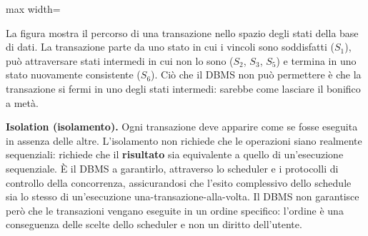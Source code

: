 \documentclass[12pt]{extarticle}
\begin{document}
\begin{center}
\begin{adjustbox}{max width=\linewidth}
\end{adjustbox}
\end{center}

\noindent La figura mostra il percorso di una transazione nello spazio degli stati della base di dati. La transazione parte da uno stato in cui i vincoli sono soddisfatti ($S_1$), può attraversare stati intermedi in cui non lo sono ($S_2$, $S_3$, $S_5$) e termina in uno stato nuovamente consistente ($S_6$). Ciò che il DBMS non può permettere è che la transazione si fermi in uno degli stati intermedi: sarebbe come lasciare il bonifico a metà.

\medskip
\noindent \textbf{Isolation (isolamento).} Ogni transazione deve apparire come se fosse eseguita in assenza delle altre. L'isolamento non richiede che le operazioni siano realmente sequenziali: richiede che il \textbf{risultato} sia equivalente a quello di un'esecuzione sequenziale. È il DBMS a garantirlo, attraverso lo scheduler e i protocolli di controllo della concorrenza, assicurandosi che l'esito complessivo dello schedule sia lo stesso di un'esecuzione una-transazione-alla-volta. Il DBMS non garantisce però che le transazioni vengano eseguite in un ordine specifico: l'ordine è una conseguenza delle scelte dello scheduler e non un diritto dell'utente.
\end{document}
